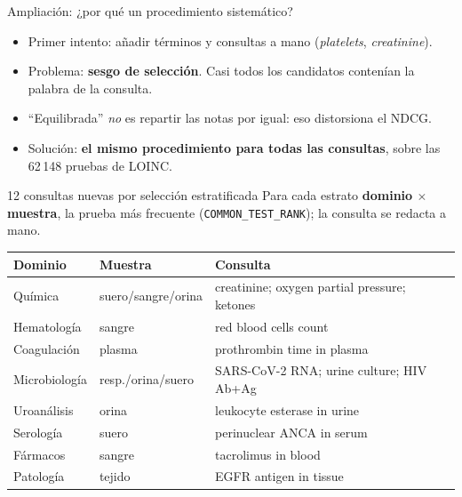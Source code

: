 \documentclass{beamer}
\newcommand{\code}[1]{\texttt{#1}}
\begin{document}
\begin{frame}{Ampliación: ¿por qué un procedimiento sistemático?}
    \begin{itemize}
        \item Primer intento: añadir términos y consultas a mano (\emph{platelets}, \emph{creatinine}).
        \item Problema: \textbf{sesgo de selección}. Casi todos los candidatos contenían la palabra de la consulta.
        \item ``Equilibrada'' \emph{no} es repartir las notas por igual: eso distorsiona el NDCG.
        \item Solución: \textbf{el mismo procedimiento para todas las consultas}, sobre las 62\,148 pruebas de LOINC.
    \end{itemize}

\end{frame}

\begin{frame}{12 consultas nuevas por selección estratificada}
    \small Para cada estrato \textbf{dominio $\times$ muestra}, la prueba más frecuente (\code{COMMON\_TEST\_RANK});
    la consulta se redacta a mano.
    \vspace{4pt}

    \centering\scriptsize
    \begin{tabular}{lll}
        \toprule
        Dominio & Muestra & Consulta \\
        \midrule
        Química & suero/sangre/orina & creatinine; oxygen partial pressure; ketones \\
        Hematología & sangre & red blood cells count \\
        Coagulación & plasma & prothrombin time in plasma \\
        Microbiología & resp./orina/suero & SARS-CoV-2 RNA; urine culture; HIV Ab+Ag \\
        Uroanálisis & orina & leukocyte esterase in urine \\
        Serología & suero & perinuclear ANCA in serum \\
        Fármacos & sangre & tacrolimus in blood \\
        Patología & tejido & EGFR antigen in tissue \\
        \bottomrule
    \end{tabular}

\end{frame}
\end{document}
